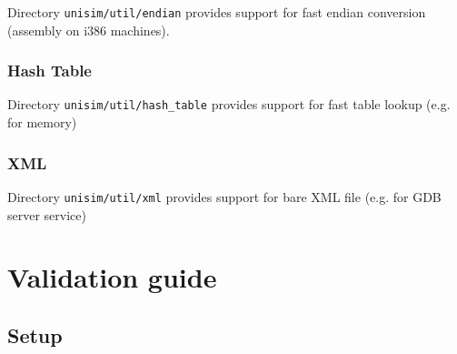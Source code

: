 Directory \texttt{unisim/util/endian} provides support for fast endian conversion (assembly on i386 machines).

\subsubsection{Hash Table}

Directory \texttt{unisim/util/hash\_table} provides support for fast table lookup (e.g. for memory)

\subsubsection{XML}

Directory \texttt{unisim/util/xml} provides support for bare XML file (e.g. for GDB server service)

\newpage
\section{Validation guide}

\subsection{Setup}


